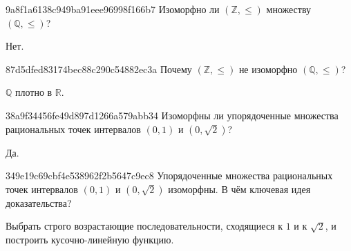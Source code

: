 \begin{note}{9a8f1a6138c949ba91eee96998f166b7}
    Изоморфно ли \({ (\mathbb Z, \leqslant) }\) множеству \({ (\mathbb Q, \leqslant) }\)?

    \begin{cloze}{1}
        Нет.
    \end{cloze}
\end{note}

\begin{note}{87d5dfed83174bec88c290c54882ec3a}
    Почему \({ (\mathbb Z, \leqslant) }\) не изоморфно \({ (\mathbb Q, \leqslant) }\)?

    \begin{cloze}{1}
        \({ \mathbb Q }\) плотно в \({ \mathbb R }\).
    \end{cloze}
\end{note}

\begin{note}{38a9f34456fe49d897d1266a579abb34}
    Изоморфны ли упорядоченные множества рациональных точек интервалов \({ (0, 1) }\) и \({ (0, \sqrt{2}) }\)?

    \begin{cloze}{1}
        Да.
    \end{cloze}
\end{note}

\begin{note}{349e19c69cbf4e538962f2b5647c9ec8}
    Упорядоченные множества рациональных точек интервалов \({ (0, 1) }\) и \({ (0, \sqrt{2}) }\) изоморфны.
    В чём ключевая идея доказательства?

    \begin{cloze}{1}
        Выбрать строго возрастающие последовательности, сходящиеся к \({ 1 }\) и к \({ \sqrt{2} }\), и построить кусочно-линейную функцию.
    \end{cloze}
\end{note}


